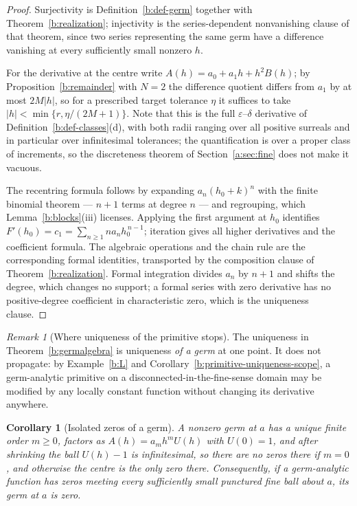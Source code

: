 \documentclass[11pt,a4paper]{article}
\numberwithin{equation}{section}
\newtheorem{corollary}[theorem]{Corollary}
\theoremstyle{definition}
\theoremstyle{remark}
\newtheorem{remark}[theorem]{Remark}
\theoremstyle{plain}
\newcommand{\abs}[1]{\lvert #1\rvert}
\begin{document}
\begin{proof}
Surjectivity is Definition~\ref{b:def-germ} together with
Theorem~\ref{b:realization}; injectivity is the series-dependent nonvanishing clause of that
theorem, since two series representing the same germ have a difference
vanishing at every sufficiently small nonzero $h$.

For the derivative at the centre write $A(h)=a_0+a_1h+h^{2}B(h)$; by
Proposition~\ref{b:remainder} with $N=2$ the difference quotient differs
from $a_1$ by at most $2M\abs h$, so for a prescribed target tolerance
$\eta$ it suffices to take $\abs h<\min\{r,\eta/(2M+1)\}$. Note that this
is the full $\varepsilon$--$\delta$ derivative of
Definition~\ref{b:def-classes}(d), with both radii ranging over all
positive surreals and in particular over infinitesimal tolerances; the
quantification is over a proper class of increments, so the discreteness
theorem of Section~\ref{a:sec:fine} does not make it vacuous.

The recentring formula follows by expanding $a_n(h_0+k)^{n}$ with the
finite binomial theorem --- $n+1$ terms at degree $n$ --- and regrouping,
which Lemma~\ref{b:blocks}(iii) licenses. Applying the first argument at
$h_0$ identifies $F'(h_0)=c_1=\sum_{n\ge1}na_nh_0^{\,n-1}$; iteration gives
all higher derivatives and the coefficient formula. The algebraic
operations and the chain rule are the corresponding formal identities,
transported by the composition clause of Theorem~\ref{b:realization}.
Formal integration divides $a_n$ by $n+1$ and shifts the degree, which
changes no support; a formal series with zero derivative has no
positive-degree coefficient in characteristic zero, which is the
uniqueness clause.
\end{proof}

\begin{remark}[Where uniqueness of the primitive stops]
\label{b:primitive-germ-only}
The uniqueness in Theorem~\ref{b:germalgebra} is uniqueness \emph{of a
germ} at one point. It does not propagate: by Example~\ref{b:L} and
Corollary~\ref{b:primitive-uniqueness-scope}, a germ-analytic primitive on
a disconnected-in-the-fine-sense domain may be modified by any locally
constant function without changing its derivative anywhere.
\end{remark}

\begin{corollary}[Isolated zeros of a germ]
\label{b:isolated}
A nonzero germ at $a$ has a unique finite order $m\ge0$, factors as
$A(h)=a_mh^{m}U(h)$ with $U(0)=1$, and after shrinking the ball
$U(h)-1$ is infinitesimal, so there are no zeros there if $m=0$, and otherwise the centre is
the only zero there.
Consequently, if a germ-analytic function has zeros meeting every
sufficiently small punctured fine ball about $a$, its germ at $a$ is zero.
\end{corollary}
\end{document}
